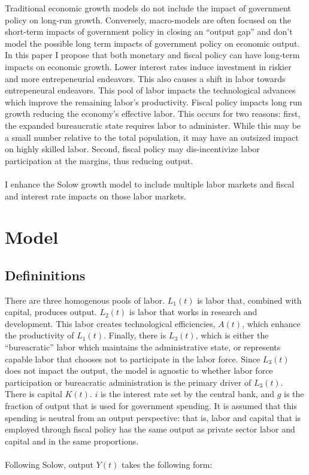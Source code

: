 \documentclass[12pt]{article}
\theoremstyle{definition}
\begin{document}
Traditional economic growth models do not include the impact of government policy on long-run growth.  Conversely, macro-models are often focused on the short-term impacts of government policy in closing an ``output gap'' and don't model the possible long term impacts of government policy on economic output.  In this paper I propose that both monetary and fiscal policy can have long-term impacts on economic growth.  Lower interest rates induce investment in riskier and more entrepeneurial endeavors.  This also causes a shift in labor towards entrepeneural endeavors.  This pool of labor impacts the technological advances which improve the remaining labor's productivity.  Fiscal policy impacts long run growth reducing the economy's effective labor.  This occurs for two reasons: first, the expanded bureaucratic state requires labor to administer.  While this may be a small number relative to the total population, it may have an outsized impact on highly skilled labor.  Second, fiscal policy may dis-incentivize labor participation at the margins, thus reducing output.
\\
\\
I enhance the Solow growth model to include multiple labor markets and fiscal and interest rate impacts on those labor markets.

\section{Model}

\subsection{Defininitions}
There are three homogenous pools of labor.  \(L_1(t)\) is labor that, combined with capital, produces output.  \(L_2(t)\) is labor that works in research and development.  This labor creates technological efficiencies, \(A(t)\), which enhance the productivity of \(L_1(t)\).  Finally, there is \(L_3(t)\), which is either the ``bureacratic'' labor which maintains the administrative state, or represents capable labor that chooses not to participate in the labor force.  Since \(L_3(t)\) does not impact the output, the model is agnostic to whether labor force participation or bureacratic administration is the primary driver of \(L_3(t)\).  There is capital \(K(t)\).  \(i\) is the interest rate set by the central bank, and \(g\) is the fraction of output that is used for government spending.  It is assumed that this spending is neutral from an output perspective: that is, labor and capital that is employed through fiscal policy has the same output as private sector labor and capital and in the same proportions.
\\
\\
Following Solow, output \(Y(t)\) takes the following form:
\end{document}
